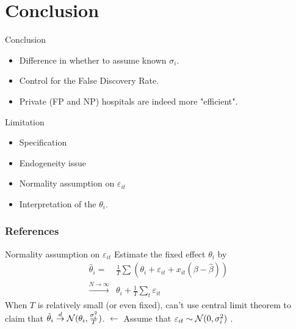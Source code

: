 \documentclass[10pt,mathserif,aspectratio=169]{beamer}
\begin{document}
\section{Conclusion}

\begin{frame}{Conclusion}
  \begin{itemize}
    \item Difference in whether to assume known $\sigma_i$.
    \item Control for the False Discovery Rate.
    \item Private (FP and NP) hospitals are indeed more "efficient".
  \end{itemize}
\end{frame}

\begin{frame}{Limitation}
  \begin{itemize}\itemsep=12pt
    \item Specification
    \item Endogeneity issue
    \item Normality assumption on $\varepsilon_{it}$
    \item Interpretation of the $\theta_i$.
  \end{itemize}
\end{frame}

\begin{frame}[allowframebreaks]
  \frametitle{References}
  
  
\end{frame}

\appendix

\begin{frame}{Normality assumption on $\varepsilon_{it}$}
  Estimate the fixed effect $\theta_i$ by
  \begin{align*}
    \hat{\theta}_i =                       & \frac{1}{T}\sum(\theta_i+\varepsilon_{it}+x_{it}(\beta-\hat{\beta})) \\
    \overset{N\to \infty}{\longrightarrow} & \theta_i+\frac{1}{T}\sum_t \varepsilon_{it}
  \end{align*}
  When $T$ is relatively small (or even fixed), can't use central limit theorem to claim that $\hat{\theta}_i \overset{d}{\to} \mathcal{N}(\theta_i,\frac{\sigma_i^2}{T})$.
  $\longleftarrow$ Assume that $\varepsilon_{it} \sim \mathcal{N}(0,\sigma_i^2)$ .

\end{frame}
\end{document}
